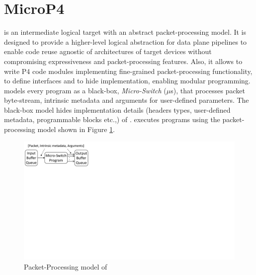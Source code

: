 \documentclass[letterpaper,twocolumn,10pt]{article}
\begin{document}



\section{MicroP4}
\label{sec:microp4}
\uswitch is an intermediate logical target with an abstract packet-processing model.
It is designed to provide a higher-level logical abstraction for data plane pipelines to enable code reuse agnostic of architectures of target devices without compromising expressiveness and packet-processing features.
Also, it allows to write P4 code modules implementing fine-grained packet-processing functionality, to define interfaces and to hide implementation, enabling modular programming.
\uswitch models every program as a black-box, \emph{Micro-Switch} ($\mu$s), that processes packet byte-stream, intrinsic metadata and arguments for user-defined parameters.
The black-box model hides implementation details (headers types, user-defined metadata, programmable blocks etc.,) of \uprograms.
\uswitch executes programs using the packet-processing model shown in Figure \ref{fig:mp4-packet-processing-model}.
\begin{figure}[h]
    \centering
    \includegraphics[trim=0 420 667 0, clip, scale=0.5]{microp4-program-model}
    \caption{Packet-Processing model of \uprograms}
    \label{fig:mp4-packet-processing-model}
\end{figure}
\end{document}

